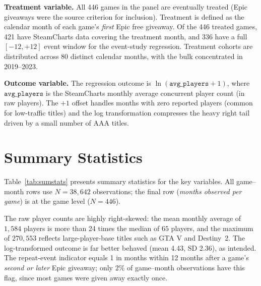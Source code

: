 \documentclass[11pt]{article}
\begin{document}
\textbf{Treatment variable.} All 446 games in the panel are eventually treated (Epic
giveaways were the source criterion for inclusion). Treatment is defined as the calendar
month of each game's \textit{first} Epic free giveaway. Of the 446 treated games, 421 have SteamCharts data covering the treatment month, and
336 have a full $[-12,+12]$ event window for the event-study regression.
Treatment cohorts are distributed across 80 distinct calendar months, with the bulk
concentrated in 2019--2023.

\textbf{Outcome variable.} The regression outcome is $\ln(\texttt{avg\_players}+1)$,
where $\texttt{avg\_players}$ is the SteamCharts monthly average concurrent player count
(in raw players). The $+1$ offset handles months with zero reported players (common for
low-traffic titles) and the log transformation compresses the heavy right tail driven by
a small number of AAA titles.

\section{Summary Statistics}

Table~\ref{tab:sumstats} presents summary statistics for the key variables. All
game--month rows use $N = 38{,}642$ observations; the final row (\textit{months observed
per game}) is at the game level ($N = 446$).

The raw player counts are highly right-skewed: the mean monthly average of
$1{,}584$ players is more than 24 times the median of $65$ players, and the maximum
of $270{,}553$ reflects large-player-base titles such as GTA V and Destiny~2. The
log-transformed outcome is far better behaved (mean 4.43, SD 2.36), as intended. The
repeat-event indicator equals 1 in months within 12 months after a game's
\textit{second or later} Epic giveaway; only 2\% of game--month observations have this
flag, since most games were given away exactly once.
\end{document}
